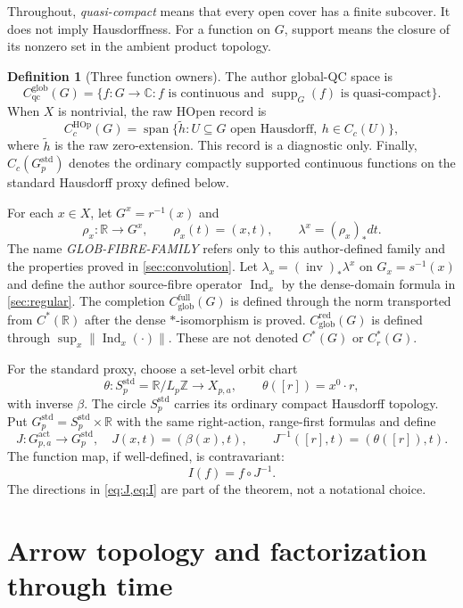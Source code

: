 \documentclass[11pt]{article}
\theoremstyle{definition}
\newtheorem{definition}[theorem]{Definition}
\newcommand{\C}{\mathbb C}
\newcommand{\R}{\mathbb R}
\newcommand{\Z}{\mathbb Z}
\newcommand{\Gact}{G_{p,a}^{\mathrm{act}}}
\newcommand{\Gstd}{G_p^{\mathrm{std}}}
\newcommand{\Xpa}{X_{p,a}}
\newcommand{\Cglob}{C_{\mathrm{qc}}^{\mathrm{glob}}}
\newcommand{\CHOp}{C_c^{\mathrm{HOp}}}
\newcommand{\Cfull}{C_{\mathrm{glob}}^{\mathrm{full}}}
\newcommand{\Cred}{C_{\mathrm{glob}}^{\mathrm{red}}}
\newcommand{\supp}{\operatorname{supp}}
\newcommand{\Ind}{\operatorname{Ind}}
\begin{document}
Throughout, \emph{quasi-compact} means that every open cover has a finite
subcover.  It does not imply Hausdorffness.  For a function on $G$, support
means the closure of its nonzero set in the ambient product topology.

\begin{definition}[Three function owners]
The author global-QC space is
\[
 \Cglob(G)=\{f:G\to\C:f\text{ is continuous and }\supp_G(f)
 \text{ is quasi-compact}\}.
\]
When $X$ is nontrivial, the raw HOpen record is
\[
 \CHOp(G)=\operatorname{span}\{\widetilde h:
 U\subseteq G\text{ open Hausdorff},\ h\in C_c(U)\},
\]
where $\widetilde h$ is the raw zero-extension.  This record is a diagnostic
only.  Finally, $C_c(\Gstd)$ denotes the ordinary compactly supported
continuous functions on the standard Hausdorff proxy defined below.
\end{definition}

For each $x\in X$, let $G^x=r^{-1}(x)$ and
\[
 \rho_x:\R\to G^x,\qquad \rho_x(t)=(x,t),\qquad
 \lambda^x=(\rho_x)_*dt.
\]
The name \emph{GLOB-FIBRE-FAMILY} refers only to this author-defined family
and the properties proved in \cref{sec:convolution}.  Let
$\lambda_x=(\operatorname{inv})_*\lambda^x$ on $G_x=s^{-1}(x)$ and define
the author source-fibre operator $\Ind_x$ by the dense-domain formula in
\cref{sec:regular}.  The completion $\Cfull(G)$ is defined through the norm
transported from $C^*(\R)$ after the dense $*$-isomorphism is proved.
$\Cred(G)$ is defined through $\sup_x\|\Ind_x(\cdot)\|$.  These are not
denoted $C^*(G)$ or $C_r^*(G)$.

For the standard proxy, choose a set-level orbit chart
\[
 \theta:S_p^{\mathrm{std}}=\R/L_p\Z\longrightarrow\Xpa,
 \qquad \theta([r])=x^0\cdot r,
\]
with inverse $\beta$.  The circle $S_p^{\mathrm{std}}$ carries its ordinary
compact Hausdorff topology.  Put $\Gstd=S_p^{\mathrm{std}}\times\R$ with
the same right-action, range-first formulas and define
\begin{equation}
 J:\Gact\to\Gstd,\quad J(x,t)=(\beta(x),t),\qquad
 J^{-1}([r],t)=(\theta([r]),t).
 \label{eq:J}
\end{equation}
The function map, if well-defined, is contravariant:
\begin{equation}
 I(f)=f\circ J^{-1}.
 \label{eq:I}
\end{equation}
The directions in \cref{eq:J,eq:I} are part of the theorem, not a notational
choice.

\section{Arrow topology and factorization through time}
\label{sec:topology}
\end{document}
